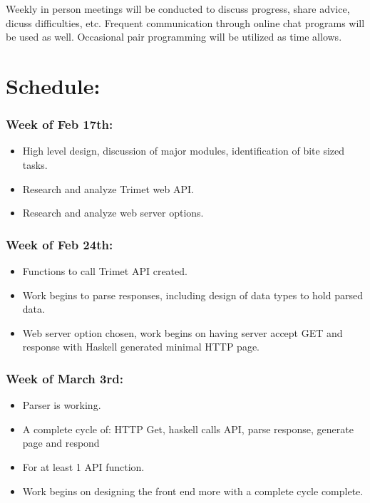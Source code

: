 \documentclass{article}
\begin{document}
Weekly in person meetings will be conducted to discuss progress, share advice, dicuss
difficulties, etc.  Frequent communication through online chat programs will be
used as well.  Occasional pair programming will be utilized as time allows.  

\section*{Schedule:}

\subsubsection*{Week of Feb 17th:}
\begin{itemize}
\item High level design, discussion of major modules, identification of bite sized tasks.
\item Research and analyze Trimet web API.
\item Research and analyze web server options.
\end{itemize}

\subsubsection*{Week of Feb 24th:}
\begin{itemize}
\item Functions to call Trimet API created.
\item Work begins to parse responses, including design of data types to hold parsed data.
\item Web server option chosen, work begins on having server accept GET and response
with Haskell generated minimal HTTP page.
\end{itemize}

\subsubsection*{Week of March 3rd:}
\begin{itemize}
\item Parser is working.
\item A complete cycle of: HTTP Get, haskell calls API, parse response, generate page and respond
\item For at least 1 API function.  
\item Work begins on designing the front end more with a complete cycle complete.
\end{itemize}
\end{document}
